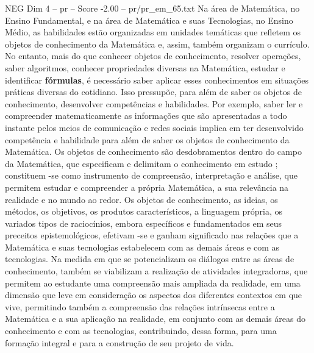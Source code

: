 \begin{textsample}{NEG Dim 4 – pr – Score -2.00 – pr/pr\_em\_65.txt}
Na área de Matemática, no Ensino Fundamental, e na área de Matemática e suas Tecnologias, no Ensino Médio, as habilidades estão organizadas em unidades temáticas que refletem os objetos de conhecimento da Matemática e, assim, também organizam o currículo.
No entanto, mais do que conhecer objetos de conhecimento, resolver operações, saber algoritmos, conhecer propriedades diversas na Matemática, estudar e identificar \textbf{fórmulas}, é necessário saber aplicar esses conhecimentos em situações práticas diversas do cotidiano.
Isso pressupõe, para além de saber os objetos de conhecimento, desenvolver competências e habilidades.
Por exemplo, saber ler e compreender matematicamente as informações que são apresentadas a todo instante pelos meios de comunicação e redes sociais implica em ter desenvolvido competência e habilidade para além de saber os objetos de conhecimento da Matemática.
Os objetos de conhecimento são desdobramentos dentro do campo da Matemática, que especificam e delimitam o conhecimento em estudo ; constituem -se como instrumento de compreensão, interpretação e análise, que permitem estudar e compreender a própria Matemática, a sua relevância na realidade e no mundo ao redor.
Os objetos de conhecimento, as ideias, os métodos, os objetivos, os produtos característicos, a linguagem própria, os variados tipos de raciocínios, embora específicos e fundamentados em seus preceitos epistemológicos, efetivam -se e ganham significado nas relações que a Matemática e suas tecnologias estabelecem com as demais áreas e com as tecnologias.
Na medida em que se potencializam os diálogos entre as áreas de conhecimento, também se viabilizam a realização de atividades integradoras, que permitem ao estudante uma compreensão mais ampliada da realidade, em uma dimensão que leve em consideração os aspectos dos diferentes contextos em que vive, permitindo também a compreensão das relações intrínsecas entre a Matemática e a sua aplicação na realidade, em conjunto com as demais áreas do conhecimento e com as tecnologias, contribuindo, dessa forma, para uma formação integral e para a construção de seu projeto de vida.

\end{textsample}
